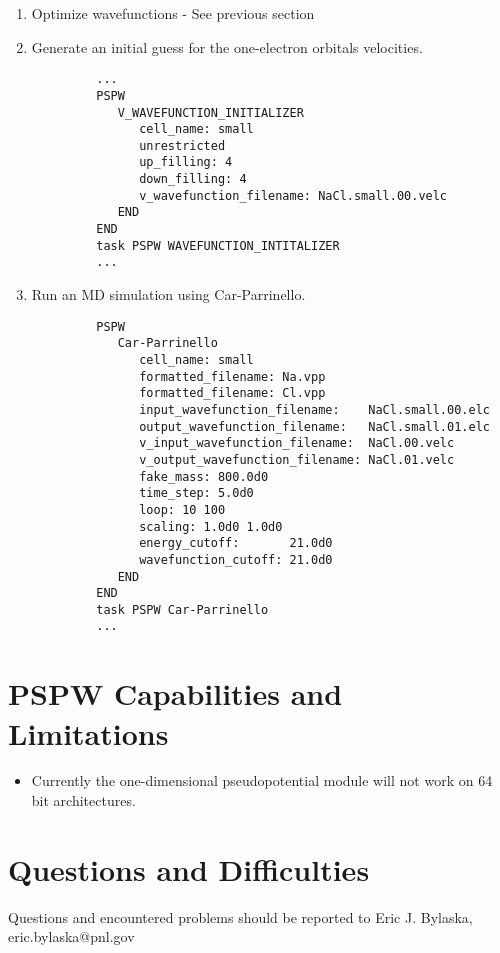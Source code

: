 \begin{enumerate}
\item Optimize wavefunctions - See previous section

\normalsize
\item Generate an initial guess for the one-electron orbitals velocities.
\tiny   \begin{verbatim}
         ...
         PSPW
            V_WAVEFUNCTION_INITIALIZER
               cell_name: small
               unrestricted
               up_filling: 4
               down_filling: 4
               v_wavefunction_filename: NaCl.small.00.velc
            END
         END
         task PSPW WAVEFUNCTION_INTITALIZER
         ...
   \end{verbatim}
\normalsize
\item Run an MD simulation using Car-Parrinello.
\tiny \begin{verbatim}
         PSPW
            Car-Parrinello
               cell_name: small
               formatted_filename: Na.vpp
               formatted_filename: Cl.vpp
               input_wavefunction_filename:    NaCl.small.00.elc
               output_wavefunction_filename:   NaCl.small.01.elc
               v_input_wavefunction_filename:  NaCl.00.velc
               v_output_wavefunction_filename: NaCl.01.velc
               fake_mass: 800.0d0
               time_step: 5.0d0
               loop: 10 100
               scaling: 1.0d0 1.0d0
               energy_cutoff:       21.0d0
               wavefunction_cutoff: 21.0d0
            END 
         END
         task PSPW Car-Parrinello
         ...
      \end{verbatim}


\end{enumerate}
\normalsize


\section{PSPW Capabilities and Limitations}
\label{sec:pspw_limits}

\begin{itemize}
\item Currently the one-dimensional pseudopotential module will not work
       on 64 bit architectures.

\end{itemize}


\section{Questions and Difficulties}

Questions and encountered problems should be reported to 
Eric J. Bylaska, eric.bylaska@pnl.gov




